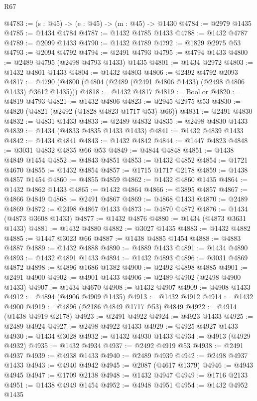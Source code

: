 \begin{lexlean}{R67}
\begin{coremodule}
@4783 := (s : @45) -> (e : @45) -> (m : @45) -> @1430
@4784 := @2979 @1435
@4785 := @1434 @4784
@4787 := @1432 @4785 @1433
@4788 := @1432 @4787
@4789 := @2099 @1433
@4790 := @1432 @4789
@4792 := @1829 @2975 @53
@4793 := @2094 @4792
@4794 := @2491 @4793
@4795 := @4794 @1433
@4800 := @2489 @4795 (@2498 @4793 @1433) @1435
@4801 := @1434 @2972
@4803 := @1432 @4801 @1433
@4804 := @1432 @4803
@4806 := @2492 @4792 @2093
@4817 := @4790 (@4800 (@4804 (@2489 (@2491 @4806 @1433) (@2498 @4806 @1433) @3612 @1435)))
@4818 := @1432 @4817
@4819 := Bool.or
@4820 := @4819 @4793
@4821 := @1432 @4806
@4823 := @2945 @2975 @53
@4830 := @4820 (@4821 (@2492 (@1828 @4823 @1717 @53) @66))
@4831 := @2491 @4830
@4832 := @4831 @1433
@4833 := @2489 @4832
@4835 := @2498 @4830 @1433
@4839 := @1434 (@4833 @4835 @1433 @1433)
@4841 := @1432 @4839 @1433
@4842 := @1434 @4841
@4843 := @1432 @4842
@4844 := @1447 @4823
@4848 := @3031 @4832 @4835 @66 @53
@4849 := @4844 @4848
@4851 := @1438 @4849 @1454
@4852 := @4843 @4851
@4853 := @1432 @4852
@4854 := @1721 @4670
@4855 := @1432 @4854
@4857 := @1715 @1717 @2178
@4859 := @1438 @4857 @1454
@4860 := @4855 @4859
@4862 := @1432 @4860 @1435
@4864 := @1432 @4862 @1433
@4865 := @1432 @4864
@4866 := @3895 @4857
@4867 := @4866 @4849
@4868 := @2491 @4867
@4869 := @4868 @1433
@4870 := @2489 @4869
@4872 := @2498 @4867 @1433
@4873 := @4870 @4872
@4876 := @1434 (@4873 @3608 @1433)
@4877 := @1432 @4876
@4880 := @1434 (@4873 @3631 @1433)
@4881 := @1432 @4880
@4882 := @3027 @1435
@4883 := @1432 @4882
@4885 := @1447 @3023 @66
@4887 := @1438 @4885 @1454
@4888 := @4883 @4887
@4889 := @1432 @4888
@4890 := @4889 @1433
@4891 := @1434 @4890
@4893 := @1432 @4891 @1433
@4894 := @1432 @4893
@4896 := @3031 @4869 @4872
@4898 := @4896 @1686 @1382
@4900 := @2492 @4898 @4885
@4901 := @2491 @4900
@4902 := @4901 @1433
@4906 := @2489 @4902 (@2498 @4900 @1433)
@4907 := @1434 @4670
@4908 := @1432 @4907
@4909 := @4908 @1433
@4912 := @4894 (@4906 @4909 @1435)
@4913 := @1432 @4912
@4914 := @1432 @4900
@4919 := @4896 (@2186 @4849 @1717 @53) @4849
@4922 := @4914 (@1438 @4919 @2178)
@4923 := @2491 @4922
@4924 := @4923 @1433
@4925 := @2489 @4924
@4927 := @2498 @4922 @1433
@4929 := @4925 @4927 @1433
@4930 := @1434 @3028
@4932 := @1432 @4930 @1433
@4934 := @4913 (@4929 @4932)
@4935 := @1432 @4934
@4937 := @2492 @4919 @53
@4938 := @2491 @4937
@4939 := @4938 @1433
@4940 := @2489 @4939
@4942 := @2498 @4937 @1433
@4943 := @4940 @4942
@4945 := @2087 (@4617 @1379)
@4946 := @4943 @4945
@4947 := @1709 @2138
@4948 := @1432 @4947
@4949 := @1716 @2133
@4951 := @1438 @4949 @1454
@4952 := @4948 @4951
@4954 := @1432 @4952 @1435

\end{coremodule}
\end{lexlean}

